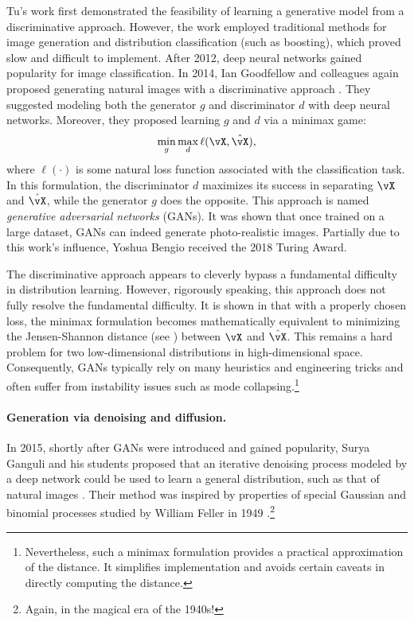 \documentclass[../../book-main.tex]{subfiles}
\begin{document}
Tu's work \cite{Tu-2007} first demonstrated the feasibility of
learning a generative model from a discriminative approach. However,
the work employed traditional methods for image generation and
distribution classification (such as boosting), which proved slow and
difficult to implement. After 2012, deep neural networks gained
popularity for image classification. In 2014, Ian Goodfellow and
colleagues again proposed generating natural images with a
discriminative approach \cite{Goodfellow-2014}. They suggested
modeling both the generator \(g\) and discriminator \(d\) with deep
neural networks. Moreover, they proposed learning \(g\) and \(d\) via
a minimax game:
\begin{equation}
    \min_{g} \max_{d} \ell(\vX, \hat{\vX}),
\end{equation}
where \(\ell(\cdot)\) is some natural loss function associated with
the classification task. In this formulation, the discriminator \(d\)
maximizes its success in separating \(\vX\) and \(\hat{\vX}\), while
the generator \(g\) does the opposite. This approach is named
\textit{generative adversarial networks} (GANs). It was shown that
once trained on a large dataset, GANs can indeed generate
photo-realistic images. Partially due to this work's influence,
Yoshua Bengio received the 2018 Turing Award.

The discriminative approach appears to cleverly bypass a fundamental
difficulty in distribution learning. However, rigorously speaking,
this approach does not fully resolve the fundamental difficulty. It
is shown in \cite{Goodfellow-2014} that with a properly chosen loss,
the minimax formulation becomes mathematically equivalent to
minimizing the Jensen-Shannon distance (see \cite{Cover-Thomas})
between \(\vX\) and \(\hat{\vX}\). This remains a hard problem for
two low-dimensional distributions in high-dimensional space.
Consequently, GANs typically rely on many heuristics and engineering
tricks and often suffer from instability issues such as mode
collapsing.\footnote{Nevertheless, such a minimax formulation
    provides a practical approximation of the distance. It simplifies
implementation and avoids certain caveats in directly computing the distance.}

\paragraph{Generation via denoising and diffusion.}
In 2015, shortly after GANs were introduced and gained popularity,
Surya Ganguli and his students proposed that an iterative denoising
process modeled by a deep network could be used to learn a general
distribution, such as that of natural images
\cite{Sohl-Dickstein2015}. Their method was inspired by properties of
special Gaussian and binomial processes studied by William Feller in
1949 \cite{Feller1949OnTT}.\footnote{Again, in the magical era of the 1940s!}
\end{document}
